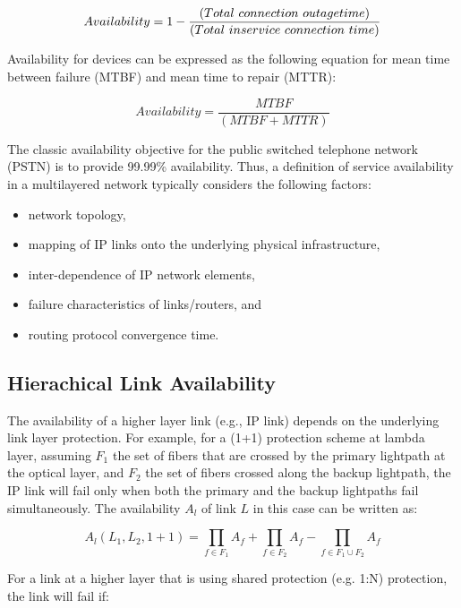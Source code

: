\begin{equation}
Availability=1-\dfrac{(Total\ connection\ outagetime)}{(Total\ in\-service\ connection\ time)}
\end{equation}


Availability for devices can be expressed as the following equation
for mean time between failure (MTBF) and mean time to repair (MTTR):

\begin{equation}
Availability=\dfrac{MTBF}{(MTBF+MTTR)}
\end{equation}


The classic availability objective for the public switched telephone
network (PSTN) is to provide 99.99\% availability. Thus, a definition
of service availability in a multilayered network typically considers
the following factors: 

\begin{itemize}
\item network topology, 
\item mapping of IP links onto the underlying physical infrastructure, 
\item inter-dependence of IP network elements, 
\item failure characteristics of links/routers, and 
\item routing protocol convergence time. 
\end{itemize}

\subsection{Hierachical Link Availability}
The availability of a higher layer link (e.g., IP link) depends on
the underlying link layer protection. For example, for a (1+1) protection
scheme at lambda layer, assuming $F_{1}$ the set of fibers that are
crossed by the primary lightpath at the optical layer, and $F_{2}$
the set of fibers crossed along the backup lightpath, the IP link
will fail only when both the primary and the backup lightpaths fail
simultaneously. The availability $A_{l}$ of link $L$ in this case
can be written as:

\begin{equation}
A_{l}(L_{1},L_{2},1+1)=
	\prod_{f\in F_{1}}A_{f}+\prod_{f\in F_{2}}A_{f}-\prod_{f\in F_{1}\cup F_{2}}A_{f}
\label{eqn:1Plus1Availability}
\end{equation}


For a link at a higher layer that is using shared protection (e.g.
1:N) protection, the link will fail if: 

